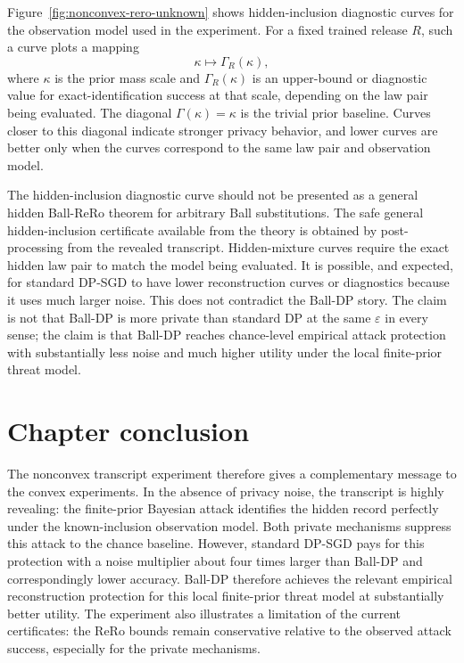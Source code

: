 \documentclass[11pt,a4paper]{report}
\theoremstyle{plain}
\theoremstyle{definition}
\theoremstyle{remark}
\begin{document}
Figure~\ref{fig:nonconvex-rero-unknown} shows hidden-inclusion diagnostic curves for the observation model used in the experiment.  For a fixed trained release $R$, such a curve plots a mapping
\[
\kappa\mapsto\Gamma_R(\kappa),
\]
where $\kappa$ is the prior mass scale and $\Gamma_R(\kappa)$ is an upper-bound or diagnostic value for exact-identification success at that scale, depending on the law pair being evaluated.  The diagonal $\Gamma(\kappa)=\kappa$ is the trivial prior baseline.  Curves closer to this diagonal indicate stronger privacy behavior, and lower curves are better only when the curves correspond to the same law pair and observation model.

The hidden-inclusion diagnostic curve should not be presented as a general hidden Ball-ReRo theorem for arbitrary Ball substitutions.  The safe general hidden-inclusion certificate available from the theory is obtained by post-processing from the revealed transcript.  Hidden-mixture curves require the exact hidden law pair to match the model being evaluated.  It is possible, and expected, for standard DP-SGD to have lower reconstruction curves or diagnostics because it uses much larger noise.  This does not contradict the Ball-DP story.  The claim is not that Ball-DP is more private than standard DP at the same $\varepsilon$ in every sense; the claim is that Ball-DP reaches chance-level empirical attack protection with substantially less noise and much higher utility under the local finite-prior threat model.

\section{Chapter conclusion}
\label{sec:nonconvex-conclusion}

The nonconvex transcript experiment therefore gives a complementary message to the convex experiments.  In the absence of privacy noise, the transcript is highly revealing: the finite-prior Bayesian attack identifies the hidden record perfectly under the known-inclusion observation model.  Both private mechanisms suppress this attack to the chance baseline.  However, standard DP-SGD pays for this protection with a noise multiplier about four times larger than Ball-DP and correspondingly lower accuracy.  Ball-DP therefore achieves the relevant empirical reconstruction protection for this local finite-prior threat model at substantially better utility.  The experiment also illustrates a limitation of the current certificates: the ReRo bounds remain conservative relative to the observed attack success, especially for the private mechanisms.
\end{document}
